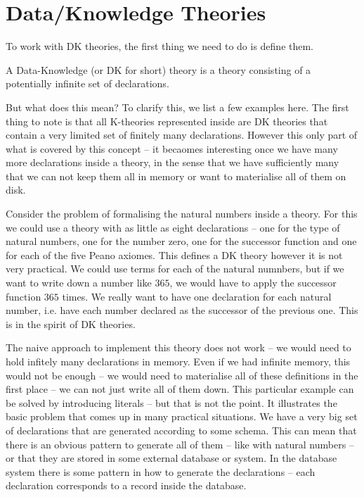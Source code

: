 \section{Data/Knowledge Theories}\label{sec:data}

To work with DK theories, the first thing we need to do is define them.
\begin{mydef}[DK theory]
  A Data-Knowledge (or DK for short) theory is a theory consisting of a potentially
  infinite set of declarations.
\end{mydef}

But what does this mean? To clarify this, we list a few examples here. The first thing to
note is that all K-theories represented inside \MMT are DK theories that contain a very
limited set of finitely many declarations. However this only part of what is covered by
this concept -- it becaomes interesting once we have many more declarations inside a
theory, in the sense that we have sufficiently many that we can not keep them all in
memory or want to materialise all of them on disk.

Consider the problem of formalising the natural numbers inside a theory. For this we could
use a theory with as little as eight declarations -- one for the type of natural numbers,
one for the number zero, one for the successor function and one for each of the five Peano
axiomes. This defines a DK theory however it is not very practical. We could use terms for
each of the natural numnbers, but if we want to write down a number like $365$, we would
have to apply the successor function $365$ times. We really want to have one declaration
for each natural number, i.e. have each number declared as the successor of the previous
one. This is in the spirit of DK theories.

The naive approach to implement this theory does not work -- we would need to hold
infitely many declarations in memory. Even if we had infinite memory, this would not be
enough -- we would need to materialise all of these definitions in the first place -- we
can not just write all of them down. This particular example can be solved by introducing
literals -- but that is not the point. It illustrates the basic problem that comes up in
many practical situations. We have a very big set of declarations that are generated
according to some schema. This can mean that there is an obvious pattern to generate all
of them -- like with natural numbers -- or that they are stored in some external database
or system. In the database system there is some pattern in how to generate the
declarations -- each declaration corresponds to a record inside the database.

